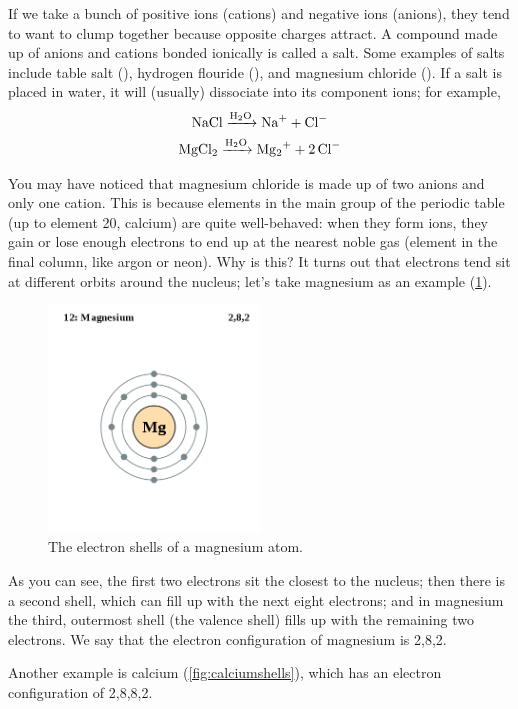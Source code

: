 \documentclass[a4paper]{memoir}
\begin{document}
If we take a bunch of positive ions (cations) and negative ions (anions), they tend to want to clump together because opposite charges attract. A compound
made up of anions and cations bonded ionically is called a salt. Some examples of salts include table salt (), hydrogen flouride (), and
magnesium chloride (). If a salt is placed in water, it will (usually) dissociate into its component ions; for example,
\begin{gather}
  \ce{NaCl ->[H2O] Na+ + Cl-}\\
  \ce{MgCl2 ->[H2O] Mg2+ + 2Cl-}
\end{gather}

You may have noticed that magnesium chloride is made up of two anions and only one cation. This is because elements in the main group of the periodic
table (up to element 20, calcium) are quite well-behaved: when they form ions, they gain or lose enough electrons to end up at the nearest noble gas (element
in the final column, like argon or neon). Why is this? It turns out that electrons tend sit at different orbits around the nucleus; let's take magnesium as
an example (\cref{fig:magnesiumshells}).

\begin{figure}
  \centering
  \includegraphics[width=0.5\textwidth]{magnesiumshells}
  \caption{The electron shells of a magnesium atom.\label{fig:magnesiumshells}}
\end{figure}

As you can see, the first two electrons sit the closest to the nucleus; then there is a second shell, which can fill up with the next eight electrons; and
in magnesium the third, outermost shell (the valence shell) fills up with the remaining two electrons. We say that the electron configuration of magnesium
is 2,8,2.

Another example is calcium (\cref{fig:calciumshells}), which has an electron configuration of 2,8,8,2.
\end{document}
